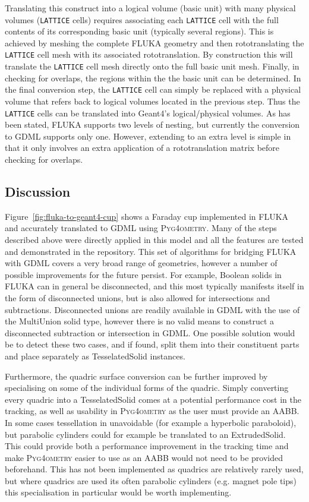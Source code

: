 \documentclass[final,5p,times,twocolumn]{elsarticle}
\newcommand{\fluka}[1]{\texttt{\MakeUppercase{#1}}}
\newcommand{\PYGEOMETRY}{\textsc{Pyg4ometry}}
\begin{document}
Translating this construct into a logical volume (basic unit) with many
physical volumes (\fluka{lattice} cells) requires associating each
\fluka{lattice} cell with the full contents of its corresponding basic unit
(typically several regions). This is achieved by meshing the complete
FLUKA geometry and then rototranslating the \fluka{lattice} cell mesh with
its associated rototranslation. By construction this will translate the
\fluka{lattice} cell mesh directly onto the full basic unit mesh. Finally,
in checking for overlaps, the regions within the the basic unit can be
determined. In the final conversion step, the \fluka{lattice} cell can
simply be replaced with a physical volume that refers back to logical
volumes located in the previous step. Thus the \fluka{lattice} cells can
be translated into Geant4's logical/physical volumes. As has been stated,
FLUKA supports two levels of nesting, but currently the conversion to GDML
supports only one. However, extending to an extra level is simple in that
it only involves an extra application of a rototranslation matrix before
checking for overlaps.

\subsection{Discussion}

Figure~\ref{fig:fluka-to-geant4-cup} shows a Faraday cup implemented in
FLUKA and accurately translated to GDML using \PYGEOMETRY{}.  Many of the
steps described above were directly applied in this model and all the
features are tested and demonstrated in the repository.  This set of
algorithms for bridging FLUKA with GDML covers a very broad range of
geometries, however a number of possible improvements for the future
persist.  For example, Boolean solids in FLUKA can in general be
disconnected, and this most typically manifests itself in the form of
disconnected unions, but is also allowed for intersections and
subtractions.  Disconnected unions are readily available in GDML with the
use of the MultiUnion solid type, however there is no valid means to
construct a disconnected subtraction or intersection in GDML.  One possible
solution would be to detect these two cases, and if found, split them into
their constituent parts and place separately as TesselatedSolid instances.

Furthermore, the quadric surface conversion can be further improved by
specialising on some of the individual forms of the quadric.  Simply
converting every quadric into a TesselatedSolid comes at a potential
performance cost in the tracking, as well as usability in \PYGEOMETRY{} as the
user must provide an AABB.  In some cases tessellation in unavoidable (for
example a hyperbolic paraboloid), but parabolic cylinders could for example
be translated to an ExtrudedSolid.  This could provide both a performance
improvement in the tracking time and make \PYGEOMETRY{} easier to use as an
AABB would not need to be provided beforehand.  This has not been
implemented as quadrics are relatively rarely used, but where quadrics are
used its often parabolic cylinders (e.g. magnet pole tips) this
specialisation in particular would be worth implementing.
\end{document}
